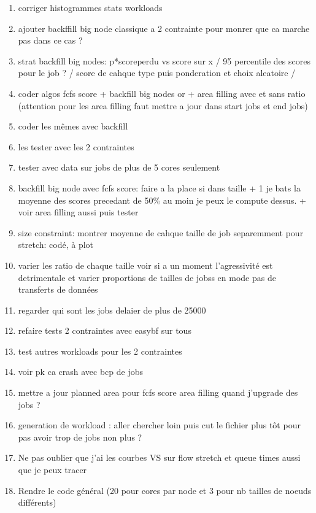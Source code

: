 \documentclass[a4paper]{article}
\begin{document}
\begin{enumerate}
			\item corriger histogrammes stats workloads
			\item ajouter backffill big node classique a 2 contrainte pour monrer que ca marche pas dans ce cas ?
			\item strat backfill big nodes: p*scoreperdu vs score sur x / 95 percentile des scores pour le job ? / score de cahque type puis ponderation et choix aleatoire /
			\item coder algos fcfs score + backfill big nodes or + area filling avec et sans ratio (attention pour les area filling faut mettre a jour dans start jobs et end jobs)
			\item coder les mêmes avec backfill
			\item les tester avec les 2 contraintes
			\item tester avec data sur jobs de plus de 5 cores seulement
			\item backfill big node avec fcfs score: faire a la place si dans taille + 1 je bats la moyenne des scores precedant de 50\% au moin je peux le compute dessus. + voir area filling aussi puis tester
			\item size constraint: montrer moyenne de cahque taille de job separemment pour stretch: codé, à plot
			\item varier les ratio de chaque taille voir si a un moment l'agressivité est detrimentale et varier proportions de tailles de jobss en mode pas de transferts de données
			\item regarder qui sont les jobs delaier de plus de 25000
			\item refaire tests 2 contraintes avec easybf sur tous
			\item test autres workloads pour les 2 contraintes
			\item voir pk ca crash avec bcp de jobs
			\item mettre a jour planned area pour fcfs score area filling quand j'upgrade des jobs ?
			\item generation de workload : aller chercher loin puis cut le fichier plus tôt pour pas avoir trop de jobs non plus ?
			\item Ne pas oublier que j'ai les courbes VS sur flow stretch et queue times aussi que je peux tracer						
			\item Rendre le code général (20 pour cores par node et 3 pour nb tailles de noeuds différents)
		\end{enumerate}
\end{document}
